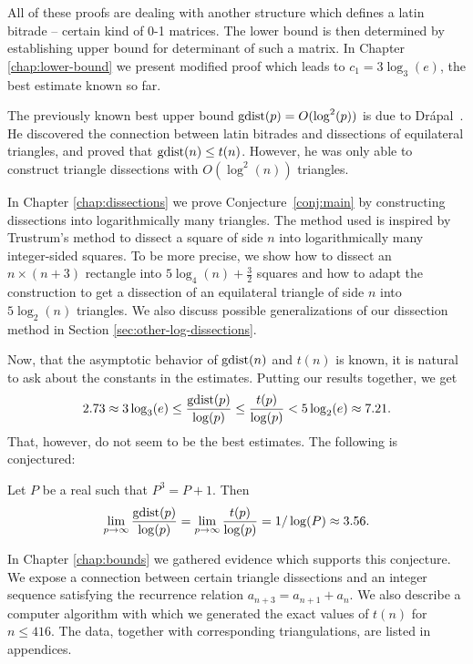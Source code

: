 All of these proofs are dealing with another structure which defines a latin bitrade -- certain kind of 0-1 matrices. The lower bound is then determined by establishing upper bound for determinant of such a matrix. In Chapter \ref{chap:lower-bound} we present modified proof which leads to $c_1 = 3 \log_3(e)$, the best estimate known so far.

\bigskip

The previously known best upper bound $\mathop{\mathrm{gdist}}(p) = O(\log^2(p))$ is due to Drápal~\cite{Drapal91}. He discovered the connection between latin bitrades and dissections of equilateral triangles, and proved that $\mathop{\mathrm{gdist}}(n) \leq t(n)$. However, he was only able to construct triangle dissections with $O(\log^2(n))$ triangles.

In Chapter \ref{chap:dissections} we prove Conjecture~\ref{conj:main} by constructing dissections into logarithmically many triangles. The method used is inspired by Trustrum's method \cite{Trustrum65} to  dissect a square of side $n$ into logarithmically many integer-sided squares. To be more precise, we show how to dissect an $n \times (n+3)$ rectangle into $5 \log_4(n) + \frac{3}{2}$ squares and how to adapt the construction to get a dissection of an equilateral triangle of side $n$ into $5 \log_2(n)$ triangles. We also discuss possible generalizations of our dissection method in Section \ref{sec:other-log-dissections}.

\bigskip

Now, that the asymptotic behavior of $\mathop{\mathrm{gdist}}(n)$ and $t(n)$ is known, it is natural to ask about the constants in the estimates. Putting our results together, we get
\begin{eqnarray}
	2.73 \approx 3 \log_3(e) \leq \frac{\mathop{\mathrm{gdist}}(p)}{\log(p)} \leq \frac{t(p)}{\log(p)} < 5 \log_2(e) \approx 7.21.
\end{eqnarray}
That, however, do not seem to be the best estimates. The following is conjectured:

\begin{conj-intro}
Let $P$ be a real such that $P^3 = P+1$. Then
\begin{eqnarray}
	\lim_{p \rightarrow \infty} \frac{\mathop{\mathrm{gdist}}(p)}{\log(p)} =
	\lim_{p \rightarrow \infty} \frac{t(p)}{\log(p)} = 1/\log(P) \approx 3.56.
\end{eqnarray}
\end{conj-intro}

In Chapter \ref{chap:bounds} we gathered evidence which supports this conjecture. We expose a connection between certain triangle dissections and an integer sequence satisfying the recurrence relation $a_{n+3} = a_{n+1} + a_n$. We also describe a computer algorithm with which we generated the exact values of $t(n)$ for $n \leq 416$. The data, together with corresponding triangulations, are listed in appendices.






